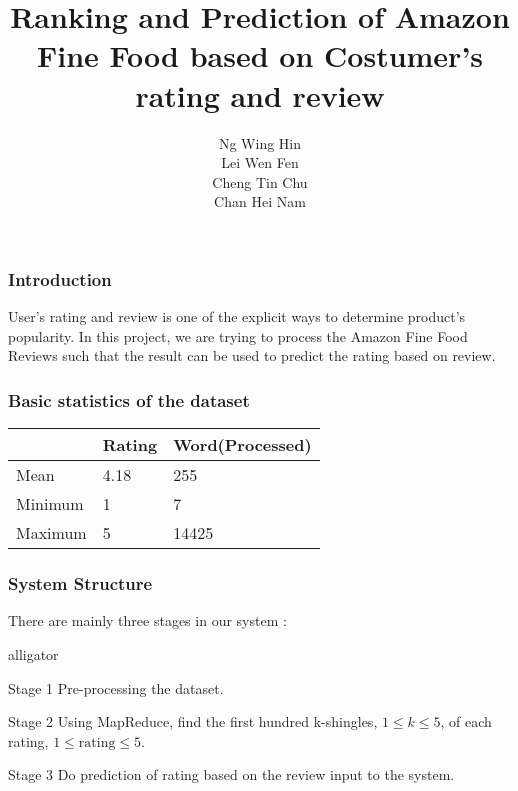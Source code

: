 \documentclass[11pt]{beamer}
\author{Ng Wing Hin\\Lei Wen Fen\\Cheng Tin Chu\\Chan Hei Nam}
\title{Ranking and Prediction of Amazon Fine Food based on Costumer's rating and review}
\date{}
\begin{document}
\theoremstyle{plain}
\newtheorem{thm}{Theorem}[section] %

\theoremstyle{definition}
\newtheorem{defn}[thm]{Definition} %
\newtheorem{exmp}[thm]{Example} %
\newtheorem{prop}{Property}[section]


\begin{frame}
\titlepage
\end{frame}


\begin{frame}
\frametitle{Introduction}
User's rating and review is one of the explicit ways to determine product's popularity. In this project, we are trying to process the Amazon Fine Food Reviews such that the result can be used to predict the rating based on review.
\end{frame}

\begin{frame}
\frametitle{Basic statistics of the dataset}

\begin{tcolorbox}[colback=blue!5,colframe=blue!40!black,title=Basic statistics of the dataset]
\centering
\begin{tabular}{lll}
	\hline
	    					& Rating 	& Word(Processed)\\
	\hline
	Mean					& 4.18 		& 255\\
	Minimum       		& 1 			& 7\\
	Maximum       		& 5 			& 14425\\
	\hline
\end{tabular}
\end{tcolorbox}
\end{frame}


\begin{frame}
\frametitle{System Structure}
There are mainly three stages in our system : 
\begin{labeling}{alligator}
\item [Stage 1] Pre-processing the dataset.
\item [Stage 2] Using MapReduce, find the first hundred k-shingles, \(1\leq k\leq 5\), of each rating, \(1 \leq \mbox{rating} \leq 5\).
\item [Stage 3] Do prediction of rating based on the review input to the system. 
\end{labeling}
\end{frame}
\end{document}
